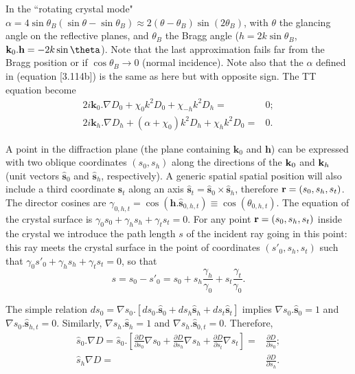 \documentclass[preprint]{iucr}              %
\newcommand{\inred}[1]{{\color{red}#1}}
\begin{document}
In the ``rotating crystal mode" $\alpha=4 \sin \theta_B (\sin \theta - \sin \theta_B) \approx 2 (\theta-\theta_B) \sin (2\theta_B)$, with $\theta$ the glancing angle on the reflective planes, and $\theta_B$ the Bragg angle ($h=2 k \sin\theta_B$, $\textbf k_0 . \textbf h = -2 k \sin\theta$). Note that the last approximation fails far from the Bragg position or if $\cos\theta_B \rightarrow 0$ (normal incidence). \inred{Note also that the $\alpha$ defined in \cite{ZachariasenBook} (equation [3.114b]) is the same as here but with opposite sign.  }
The TT equation become
\begin{subequations}
\label{eq:TTvectorAlpha}
\begin{align}
2 i \textbf{k}_0 . \nabla D_0 + \chi_0 k^2 D_0 + \chi_{-h} k^2 D_h =& 0; \\
2 i \textbf{k}_h . \nabla D_h + (\alpha + \chi_0) k^2 D_h + \chi_{h} k^2 D_0 =& 0.
\end{align}
\end{subequations}

A point in the diffraction plane (the plane containing $\textbf{k}_0$ and $\textbf{h}$) 
can be expressed with two oblique coordinates $(s_0,s_h)$ along the directions of the $\textbf k_0$ and $\textbf k_h$ (unit vectors $\hat{ \textbf{s}}_{0}$ and $\hat{ \textbf{s}}_{h}$, respectively). A generic spatial spatial position will also include a third coordinate $\textbf{s}_t$ along an axis $\hat{\textbf{s}}_t=\hat{\textbf{s}}_0 \times \hat{\textbf{s}}_h$, therefore $\textbf r=(s_0,s_h,s_t)$. The director cosines are $\gamma_{0,h,t}=\cos(\textbf{h} . \hat{\textbf{s}}_{0,h,t}) \equiv \cos(\theta_{0,h,t})$. The equation of the crystal surface is $\gamma_0 s_0 + \gamma_h s_h + \gamma_t s_t=0$. For any point $\textbf r=(s_0,s_h,s_t)$ inside the crystal we introduce the path length $s$ \inred{of the incident ray going in this point}: this ray meets the crystal surface in the point of coordinates $(s'_0,s_h,s_t)$ such that $\gamma_0 s'_0+\gamma_h s_h + \gamma_t s_t=0$, so that 
\begin{equation}
\label{eq:s}
s = s_0 - s'_0 = s_0 + s_h \frac{\gamma_h}{\gamma_0} + s_t \frac{\gamma_t}{\gamma_0}.
\end{equation}

The simple relation $d s_0 = \nabla s_0 . [ d s_0 . \hat{\textbf{s}}_0 + d s_h \hat{\textbf{s}}_h + d s_t \hat{\textbf{s}}_t ]$ implies $\nabla s_0 . \hat{\textbf{s}}_0=1$ and $\nabla s_0 . \hat{\textbf{s}}_{h,t}=0$. Similarly, $\nabla s_h . \hat{\textbf{s}}_h=1$ and $\nabla s_h . \hat{\textbf{s}}_{0,t}=0$. Therefore, 
\begin{subequations}
\label{eq:equalities}
\begin{align}
\hat s_0 . \nabla D=
\hat s_0 . \left[ 
\frac{\partial D}{\partial s_0} \nabla s_0 + 
\frac{\partial D}{\partial s_h} \nabla s_h +
\frac{\partial D}{\partial s_t} \nabla s_t
\right] 
=& \frac{\partial D}{\partial s_0}
; \\
\hat s_h \nabla D =& 
\frac{\partial D}{\partial s_h}.
\end{align}
\end{subequations}
\end{document}
